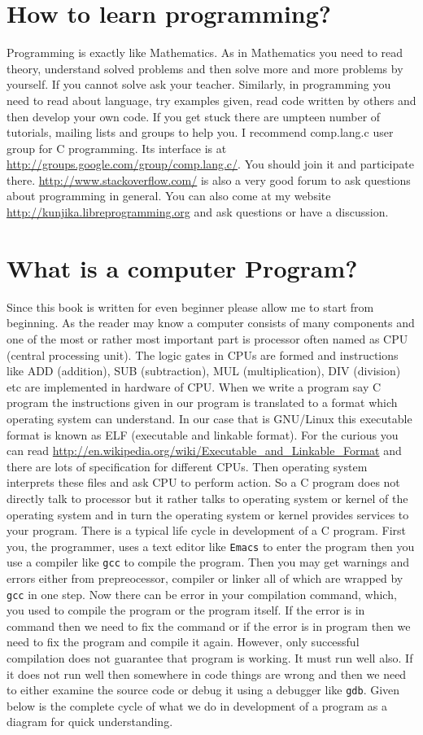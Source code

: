 \section{How to learn programming?}
Programming is exactly like Mathematics. As in Mathematics you need to read
theory, understand solved problems and then solve more and more problems by
yourself. If you cannot solve ask your teacher. Similarly, in programming you
need to read about language, try examples given, read code written by others
and then develop your own code. If you get stuck there are umpteen number of
tutorials, mailing lists and groups to help you. I recommend comp.lang.c user
group for C programming. Its interface is at
\url{http://groups.google.com/group/comp.lang.c/}. You should join it and
participate there. \url{http://www.stackoverflow.com/} is also a very good
forum to ask questions about programming in general. You can also come at my
website 
\url{http://kunjika.libreprogramming.org} and ask questions or have a
discussion. 

\section{What is a computer Program?}
Since this book is written for even beginner please allow me to start from
beginning. As the reader may know a computer consists of many components and
one of the most or rather most important part is processor often named as CPU
(central processing unit). The logic gates in CPUs are formed and instructions
like ADD (addition), SUB (subtraction), MUL (multiplication), DIV (division)
etc are implemented in hardware of CPU. When we write a program say C program
the instructions given in our program is translated to a format which operating
system can understand. In our case that is GNU/Linux this executable format is
known as ELF (executable and linkable format). For the curious you can read
\url{http://en.wikipedia.org/wiki/Executable\_and\_Linkable\_Format} and there are
lots of specification for different CPUs. Then operating system interprets
these files and ask CPU to perform action. So a C program does not directly
talk to processor but it rather talks to operating system or kernel of the
operating system and in turn the operating system or kernel provides services
to your program. There is a typical life cycle in development of a C
program. First you, the programmer, uses a text editor like \texttt{Emacs} to
enter the program then you use a compiler like \texttt{gcc} to compile the
program. Then you may get warnings and errors either from prepreocessor,
compiler or linker all of which are wrapped by \texttt{gcc} in one step. Now
there can be error in your compilation command, which, you used to compile the
program or the program itself. If the error is in command then we need to fix
the command or if the error is in program then we need to fix the program and
compile it again. However, only successful compilation does not guarantee that
program is working. It must run well also. If it does not run well then
somewhere in code things are wrong and then we need to either examine the
source code or debug it using a debugger like \texttt{gdb}. Given below is the
complete cycle of what we do in development of a program as a diagram for quick
understanding.

